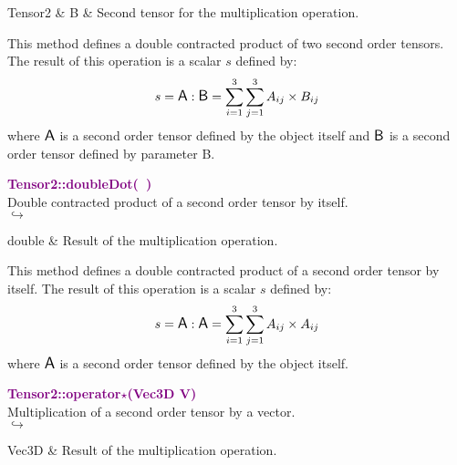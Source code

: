 \begin{tcolorbox}[width=\textwidth,myArgs,tabularx={ll|R}]
Tensor2 & B & Second tensor for the multiplication operation.
\end{tcolorbox}

This method defines a double contracted product of two second order tensors.
The result of this operation is a scalar $s$ defined by:
\begin{equation*}
s = \mbox{\large\ensuremath{\mathsf{A}}} : \mbox{\large\ensuremath{\mathsf{B}}} = \sum_{i=1}^{3} \sum_{j=1}^{3} A_{ij}\times B_{ij}
\end{equation*}
where $\mbox{\large\ensuremath{\mathsf{A}}}$ is a second order tensor defined by the object itself and $\mbox{\large\ensuremath{\mathsf{B}}}$ is a second order tensor defined by parameter B.

\textcolor{purple}{\textbf{Tensor2::doubleDot(~)}}\label{Tensor2::doubleDot()}\\
Double contracted product of a second order tensor by itself.\\ \hspace*{5mm}$\hookrightarrow$
\vspace*{-2em}\begin{tcolorbox}[grow to left by=-1cm, width=\textwidth-1cm,myArgs,tabularx={l|R}]
double & Result of the multiplication operation.
\end{tcolorbox}

This method defines a double contracted product of a second order tensor by itself.
The result of this operation is a scalar $s$ defined by:
\begin{equation*}
s = \mbox{\large\ensuremath{\mathsf{A}}} : \mbox{\large\ensuremath{\mathsf{A}}} = \sum_{i=1}^{3} \sum_{j=1}^{3} A_{ij}\times A_{ij}
\end{equation*}
where $\mbox{\large\ensuremath{\mathsf{A}}}$ is a second order tensor defined by the object itself.

\textcolor{purple}{\textbf{Tensor2::operator$\star$(Vec3D V)}}\label{Tensor2::operator*(Vec3D V)}\\
Multiplication of a second order tensor by a vector.\\ \hspace*{5mm}$\hookrightarrow$
\vspace*{-2em}\begin{tcolorbox}[grow to left by=-1cm, width=\textwidth-1cm,myArgs,tabularx={l|R}]
Vec3D & Result of the multiplication operation.
\end{tcolorbox}


